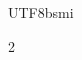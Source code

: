 \documentclass{article}
\begin{document}
\begin{CJK*}{UTF8}{bsmi}
\begin{spacing}{2}
\begin{large}
        
        

        
    \end{large}
\end{spacing}

\end{CJK*}
\end{document}
